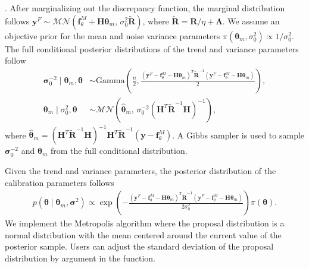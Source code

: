 . After marginalizing out the discrepancy function, the marginal distribution follows $\mathbf y^F \sim \mathcal{MN}(\mathbf f^M_{\theta}+\mathbf H \bm \theta_{m},\, \sigma^2_0 \tilde {\mathbf R})$, where $\tilde {\mathbf R}=\mathbf R/\eta+ \bm \Lambda$. We assume an objective prior for the mean and noise variance parameters $\pi(\bm \theta_m, \sigma^2_0)\propto 1/\sigma^2_0$.    The full conditional posterior distributions of the trend and variance parameters follow 
\begin{align*}
\bm \sigma^{-2}_0 \mid \bm \theta_m,  \bm \theta &\sim \mbox{Gamma}\left(\frac{n}{2},  \frac{(\mathbf y^F-\mathbf f^M_{\theta}- \mathbf H \bm \theta_m )^T\bm {\tilde R}^{-1}(\mathbf y^F-\mathbf f^M_{\theta}- \mathbf H \bm \theta_m )}{2}  \right), \\ 
\bm \theta_m \mid \sigma^2_0, \bm \theta &\sim  \mathcal{MN}\left(   \bm { \hat \theta}_m, \,  \sigma^{-2}_0(\mathbf H^T\bm {\tilde R}^{-1} \mathbf H)^{-1} \right), 
\end{align*}
where $\hat {\bm \theta}_m= \left( \mathbf H^T {{\mathbf { \tilde R}}}^{-1}  \mathbf H \right)^{-1} \mathbf H^T {{\mathbf { \tilde R}}}^{-1}{(\mathbf{y}-\mathbf f^M_{\theta})}$. A Gibbs sampler is used to sample $\bm \sigma^{-2}_0$ and $\bm \theta_m$ from the full conditional distribution. 

Given the trend and variance parameters, the posterior distribution of the calibration parameters follows
\begin{align*}
p(\bm \theta \mid \bm \theta_m, \bm \sigma^{2} )\propto \exp\left( - \frac{(\mathbf y^F-\mathbf f^M_{\theta}- \mathbf H \bm \theta_m )^T \mathbf { \tilde R}^{-1}(\mathbf y^F-\mathbf f^M_{\theta}- \mathbf H \bm \theta_m )  }{2\sigma^2_0}\right)\pi(\bm \theta).
\end{align*}
We implement the Metropolis algorithm where the proposal distribution  is  a normal distribution with the mean centered around the current value of the posterior sample. Users can adjust the standard deviation of the proposal distribution by argument   in the  function.  %


